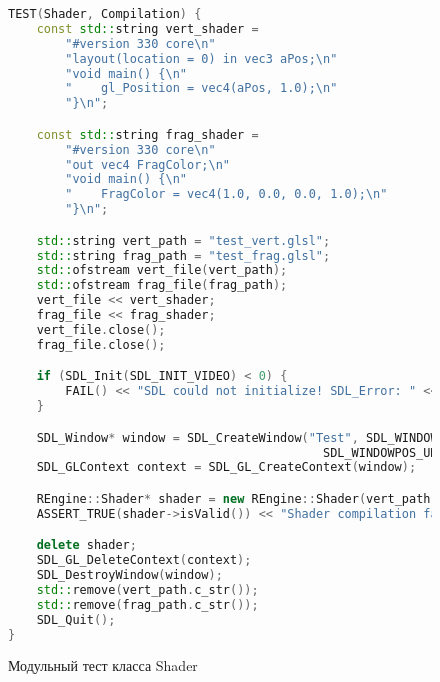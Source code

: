 \begin{figure}[ht]
\begin{lstlisting}[language=C++]
TEST(Shader, Compilation) {
    const std::string vert_shader =
        "#version 330 core\n"
        "layout(location = 0) in vec3 aPos;\n"
        "void main() {\n"
        "    gl_Position = vec4(aPos, 1.0);\n"
        "}\n";

    const std::string frag_shader =
        "#version 330 core\n"
        "out vec4 FragColor;\n"
        "void main() {\n"
        "    FragColor = vec4(1.0, 0.0, 0.0, 1.0);\n"
        "}\n";

    std::string vert_path = "test_vert.glsl";
    std::string frag_path = "test_frag.glsl";
    std::ofstream vert_file(vert_path);
    std::ofstream frag_file(frag_path);
    vert_file << vert_shader;
    frag_file << frag_shader;
    vert_file.close();
    frag_file.close();

    if (SDL_Init(SDL_INIT_VIDEO) < 0) {
        FAIL() << "SDL could not initialize! SDL_Error: " << SDL_GetError();
    }

    SDL_Window* window = SDL_CreateWindow("Test", SDL_WINDOWPOS_UNDEFINED,
                                            SDL_WINDOWPOS_UNDEFINED, 640, 480, SDL_WINDOW_OPENGL);
    SDL_GLContext context = SDL_GL_CreateContext(window);

    REngine::Shader* shader = new REngine::Shader(vert_path.c_str(), frag_path.c_str());
    ASSERT_TRUE(shader->isValid()) << "Shader compilation failed";

    delete shader;
    SDL_GL_DeleteContext(context);
    SDL_DestroyWindow(window);
    std::remove(vert_path.c_str());
    std::remove(frag_path.c_str());
    SDL_Quit();
}
\end{lstlisting}  
\caption{Модульный тест класса Shader}
\label{unitShader:image}
\end{figure}

